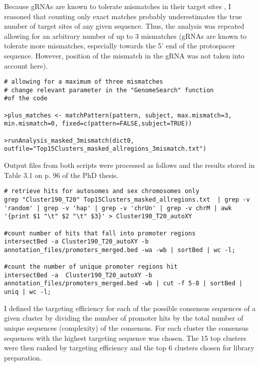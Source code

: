 Because gRNAs are known to tolerate mismatches in their target sites \cite{Mali:2013ft}, I reasoned that counting only exact matches probably underestimates the true number of target sites of any given sequence. Thus, the analysis was repeated allowing for an arbitrary number of up to 3 mismatches (gRNAs are known to tolerate more mismatches, especially towards the 5' end of the protospacer sequence. However, position of the mismatch in the gRNA was not taken into account here).

\begin{lstlisting}
# allowing for a maximum of three mismatches
# change relevant parameter in the "GenomeSearch" function 
#of the code

>plus_matches <- matchPattern(pattern, subject, max.mismatch=3, min.mismatch=0, fixed=c(pattern=FALSE,subject=TRUE))

>runAnalysis_masked_3mismatch(dict0, outfile="Top15Clusters_masked_allregions_3mismatch.txt")
\end{lstlisting}

Output files from both scripts were processed as follows and the results stored in Table 3.1 on p. 96 of the PhD thesis.

\begin{lstlisting}
# retrieve hits for autosomes and sex chromosomes only
grep "Cluster190_T20" Top15Clusters_masked_allregions.txt  | grep -v 'random' | grep -v 'hap' | grep -v 'chrUn' | grep -v chrM | awk '{print $1 "\t" $2 "\t" $3}' > Cluster190_T20_autoXY 

#count number of hits that fall into promoter regions
intersectBed -a Cluster190_T20_autoXY -b annotation_files/promoters_merged.bed -wa -wb | sortBed | wc -l;    

#count the number of unique promoter regions hit
intersectBed -a  Cluster190_T20_autoXY -b  annotation_files/promoters_merged.bed -wb | cut -f 5-8 | sortBed | uniq | wc -l;
\end{lstlisting}

I defined the targeting efficiency for each of the possible consensus sequences of a given cluster by dividing the number of promoter hits by the total number of unique sequences (complexity) of the consensus. For each cluster the consensus sequences with the highest targeting sequence was chosen. The 15 top clusters were then ranked by targeting efficiency and the top 6 clusters chosen for library preparation.
